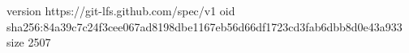version https://git-lfs.github.com/spec/v1
oid sha256:84a39c7c24f3cee067ad8198dbe1167eb56d66df1723cd3fab6dbb8d0e43a933
size 2507
